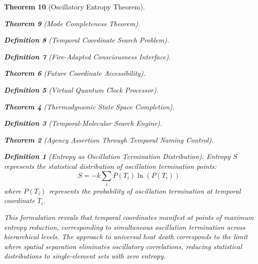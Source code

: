 \documentclass[12pt,a4paper]{article}
\newtheorem{theorem}{Theorem}[section]
\newtheorem{definition}[theorem]{Definition}
\begin{document}
\begin{theorem}[Oscillatory Entropy Theorem]
\begin{theorem}[Mode Completeness Theorem]
\begin{enumerate}
\begin{definition}[Temporal Coordinate Search Problem]
\begin{algorithm}
\begin{definition}[Fire-Adapted Consciousness Interface]
\begin{theorem}[Future Coordinate Accessibility]
\begin{definition}[Virtual Quantum Clock Processor]
\begin{itemize}
\begin{itemize}
\begin{theorem}[Thermodynamic State Space Completion]
\begin{definition}[Temporal-Molecular Search Engine]
\begin{theorem}[Agency Assertion Through Temporal Naming Control]
\begin{remark}
\begin{definition}[Entropy as Oscillation Termination Distribution]
Entropy $S$ represents the statistical distribution of oscillation termination points:
$$S = -k \sum_i P(T_i) \ln(P(T_i))$$
where $P(T_i)$ represents the probability of oscillation termination at temporal coordinate $T_i$.
\end{definition}

This formulation reveals that temporal coordinates manifest at points of maximum entropy reduction, corresponding to simultaneous oscillation termination across hierarchical levels. The approach to universal heat death corresponds to the limit where spatial separation eliminates oscillatory correlations, reducing statistical distributions to single-element sets with zero entropy.

\begin{figure}[h]
\centering
{}
\end{figure}
\end{remark}
\end{theorem}
\end{definition}
\end{theorem}
\end{itemize}
\end{itemize}
\end{definition}
\end{theorem}
\end{definition}
\end{algorithm}
\end{definition}
\end{enumerate}
\end{theorem}
\end{theorem}
\end{document}
